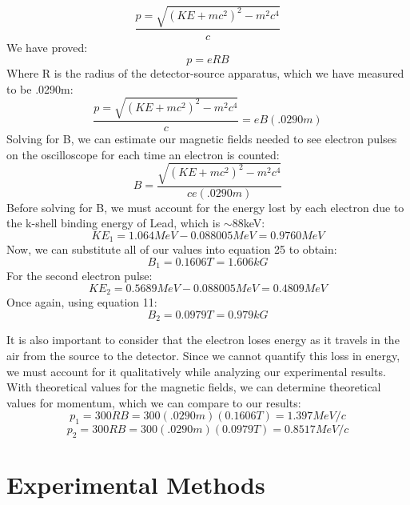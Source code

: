 \begin{equation}\frac{p=\sqrt{(KE+mc^2)^2-m^2c^4}}{c}\end{equation}
We have proved:
\begin{equation}p=eRB\end{equation}
Where R is the radius of the detector-source apparatus, which we have measured to be .0290m:
\begin{equation}\frac{p=\sqrt{(KE+mc^2)^2-m^2c^4}}{c}=eB(.0290m)\end{equation}
Solving for B, we can estimate our magnetic fields needed to see electron pulses on the oscilloscope for each time an electron is counted:
\begin{equation}B=\frac{\sqrt{(KE+mc^2)^2-m^2c^4}}{ce(.0290m)}\end{equation}
Before solving for B, we must account for the energy lost by each electron due to the k-shell binding energy of Lead, which is $\sim$88keV:
\begin{equation}KE_1=1.064MeV-0.088005MeV=0.9760 MeV\end{equation}
Now, we can substitute all of our values into equation 25 to obtain:
\begin{equation} B_1=0.1606T=1.606kG\end{equation}
For the second electron pulse:
\begin{equation}KE_2=0.5689MeV-0.088005MeV=0.4809MeV\end{equation}
Once again, using equation 11:
\begin{equation}B_2=0.0979T=0.979kG\end{equation}

It is also important to consider  that the electron loses energy as it travels in the air from the source to the detector. Since we cannot quantify this loss in energy, we must account for it qualitatively while analyzing our  experimental results. With theoretical values for the magnetic fields, we can determine theoretical values for momentum, which we can compare to our results:
\begin{equation}p_1=300RB=300(.0290m)(0.1606T)=1.397 MeV/c\end{equation}
\begin{equation}p_2=300RB=300(.0290m)(0.0979T)=0.8517 MeV/c\end{equation}

\section{Experimental Methods}
